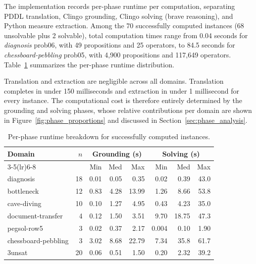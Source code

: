 The implementation records per-phase runtime per computation, separating \ac{PDDL} translation, Clingo grounding, Clingo solving (brave reasoning), and Python measure extraction. Among the 70 successfully computed instances (68 unsolvable plus 2 solvable), total computation times range from 0.04 seconds for \textit{diagnosis} prob06, with 49 propositions and 25 operators, to 84.5 seconds for \textit{chessboard-pebbling} prob05, with 4{,}900 propositions and 117{,}649 operators. Table~\ref{tab:timing} summarizes the per-phase runtime distribution.

Translation and extraction are negligible across all domains. Translation completes in under 150 milliseconds and extraction in under 1 millisecond for every instance. The computational cost is therefore entirely determined by the grounding and solving phases, whose relative contributions per domain are shown in Figure~\ref{fig:phase_proportions} and discussed in Section~\ref{sec:phase_analysis}.

\begin{table}[ht]
    \centering
    \small
    \begin{tabular}{lr rrr rrr}
        \toprule
        \textbf{Domain}     & $n$ & \multicolumn{3}{c}{\textbf{Grounding (s)}} & \multicolumn{3}{c}{\textbf{Solving (s)}}                                \\
        \cmidrule(lr){3-5}\cmidrule(lr){6-8}
                            &     & Min                                        & Med                                      & Max   & Min   & Med   & Max  \\
        \midrule
        diagnosis           & 18  & 0.01                                       & 0.05                                     & 0.35  & 0.02  & 0.39  & 43.0 \\
        bottleneck          & 12  & 0.83                                       & 4.28                                     & 13.99 & 1.26  & 8.66  & 53.8 \\
        cave-diving         & 10  & 0.10                                       & 1.27                                     & 4.95  & 0.43  & 4.23  & 35.0 \\
        document-transfer   & 4   & 0.12                                       & 1.50                                     & 3.51  & 9.70  & 18.75 & 47.3 \\
        pegsol-row5         & 3   & 0.02                                       & 0.37                                     & 2.17  & 0.004 & 0.10  & 1.90 \\
        chessboard-pebbling & 3   & 3.02                                       & 8.68                                     & 22.79 & 7.34  & 35.8  & 61.7 \\
        3unsat              & 20  & 0.06                                       & 0.51                                     & 1.50  & 0.20  & 2.32  & 39.2 \\
        \bottomrule
    \end{tabular}
    \caption{Per-phase runtime breakdown for successfully computed instances.}
    \label{tab:timing}
\end{table}

